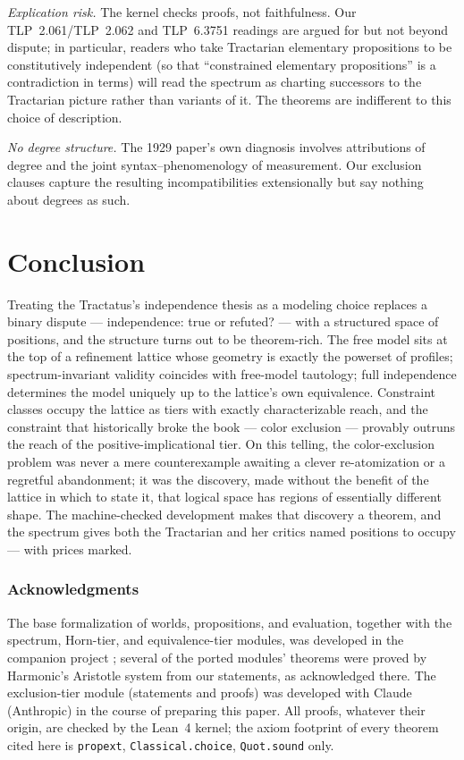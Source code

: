 \documentclass[10pt, letterpaper]{article}
\theoremstyle{remark}
\newcommand{\lean}[1]{\texttt{#1}}
\newcommand{\TLP}[1]{TLP~#1}
\begin{document}
\emph{Explication risk.} The kernel checks proofs, not faithfulness. Our
\TLP{2.061}/\TLP{2.062} and \TLP{6.3751} readings are argued for but not
beyond dispute; in particular, readers who take Tractarian elementary
propositions to be constitutively independent (so that ``constrained
elementary propositions'' is a contradiction in terms) will read the spectrum
as charting successors to the Tractarian picture rather than variants of it.
The theorems are indifferent to this choice of description.

\emph{No degree structure.} The 1929 paper's own diagnosis involves
attributions of degree and the joint syntax--phenomenology of measurement.
Our exclusion clauses capture the resulting incompatibilities extensionally
but say nothing about degrees as such.

\section{Conclusion}\label{sec:conclusion}

Treating the Tractatus's independence thesis as a modeling choice replaces a
binary dispute --- independence: true or refuted? --- with a structured
space of positions, and the structure turns out to be theorem-rich. The free
model sits at the top of a refinement lattice whose geometry is exactly the
powerset of profiles; spectrum-invariant validity coincides with free-model
tautology; full independence determines the model uniquely up to the
lattice's own equivalence. Constraint classes occupy the lattice as tiers
with exactly characterizable reach, and the constraint that historically
broke the book --- color exclusion --- provably outruns the reach of the
positive-implicational tier. On this telling, the color-exclusion problem
was never a mere counterexample awaiting a clever re-atomization or a
regretful abandonment; it was the discovery, made without the benefit of the
lattice in which to state it, that logical space has regions of essentially
different shape. The machine-checked development makes that discovery a
theorem, and the spectrum gives both the Tractarian and her critics named
positions to occupy --- with prices marked.

\subsubsection*{Acknowledgments}

The base formalization of worlds, propositions, and evaluation, together with
the spectrum, Horn-tier, and equivalence-tier modules, was developed in the
companion project \cite{companion2026}; several of the ported modules'
theorems were proved by Harmonic's Aristotle system from our statements, as
acknowledged there. The exclusion-tier module (statements and proofs) was
developed with Claude (Anthropic) in the course of preparing this paper. All
proofs, whatever their origin, are checked by the Lean~4 kernel; the axiom
footprint of every theorem cited here is \lean{propext},
\lean{Classical.choice}, \lean{Quot.sound} only.
\end{document}
